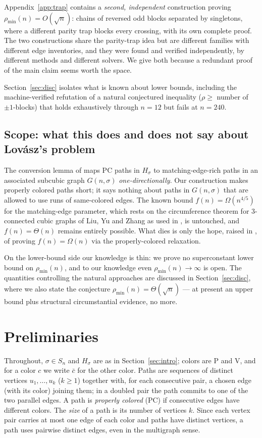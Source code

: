 \documentclass[11pt]{article}
\theoremstyle{definition}
\newcommand{\pmin}{\rho_{\min}}
\begin{document}
Appendix~\ref{app:trap} contains a \emph{second, independent} construction proving
$\pmin(n) = O(\sqrt n)$: chains of reversed odd blocks separated by singletons, where
a different parity trap blocks every crossing, with its own complete proof. The two
constructions share the parity-trap idea but are different families with different
edge inventories, and they were found and verified independently, by different
methods and different solvers. We give both because a redundant proof of the main
claim seems worth the space.

Section~\ref{sec:disc} isolates what is known about lower bounds, including the
machine-verified refutation of a natural conjectured inequality
($\rho \ge$ number of $\pm1$-blocks) that holds exhaustively through $n = 12$ but
fails at $n = 240$.

\subsection{Scope: what this does and does not say about Lov\'asz's
problem}\label{subsec:scope}

The conversion lemma of \cite{Liz26} maps PC paths in $H_\sigma$ to
matching-edge-rich paths in an associated subcubic graph $G(n,\sigma)$
\emph{one-directionally}. Our construction makes properly colored paths short; it
says nothing about paths in $G(n,\sigma)$ that are allowed to use runs of
same-colored edges. The known bound $f(n) = \Omega(n^{4/5})$ for the matching-edge
parameter, which rests on the circumference theorem for $3$-connected cubic graphs of
Liu, Yu and Zhang \cite{LYZ18} as used in \cite{NSTW25}, is untouched, and
$f(n) = \Theta(n)$ remains entirely possible. What dies is only the hope, raised in
\cite{Liz26}, of proving $f(n) = \Omega(n)$ via the properly-colored relaxation.

On the lower-bound side our knowledge is thin: we prove no superconstant lower bound
on $\pmin(n)$, and to our knowledge even $\pmin(n) \to \infty$ is open. The
quantities controlling the natural approaches are discussed in
Section~\ref{sec:disc}, where we also state the conjecture
$\pmin(n) = \Theta(\sqrt n)$ --- at present an upper bound plus structural
circumstantial evidence, no more.

\section{Preliminaries}\label{sec:prelim}

Throughout, $\sigma \in S_n$ and $H_\sigma$ are as in Section~\ref{sec:intro}; colors
are $\mathrm P$ and $\mathrm V$, and for a color $c$ we write $\bar c$ for the other
color. Paths are sequences of distinct vertices $u_1,\dots,u_k$ ($k \ge 1$) together
with, for each consecutive pair, a chosen edge (with its color) joining them; in a
doubled pair the path commits to one of the two parallel edges. A path is
\emph{properly colored} (PC) if consecutive edges have different colors. The
\emph{size} of a path is its number of vertices $k$. Since each vertex pair carries
at most one edge of each color and paths have distinct vertices, a path uses pairwise
distinct edges, even in the multigraph sense.
\end{document}
